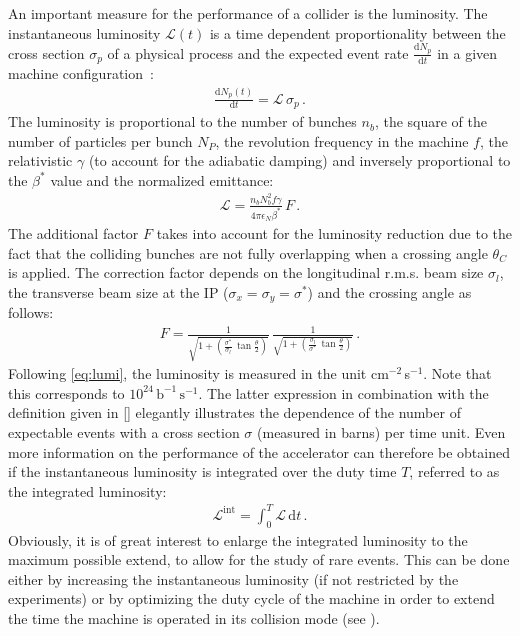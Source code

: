 An important measure for the performance of a collider is the luminosity. The instantaneous luminosity $\mathcal{L}(t)$ is a time dependent proportionality between the cross section $\sigma_p$ of a physical process and the expected event rate $\frac{\mathrm{d}N_p}{\mathrm{d}t}$ in a given machine configuration~\cite{wiedemann1999particle}:
%
\begin{align}
  \frac{\mathrm{d}N_p (t)}{\mathrm{d}t} = \mathcal{L} \, \sigma_p \, .
\end{align}
%
The luminosity is proportional to the number of bunches $n_b$, the square of the number of particles per bunch $N_P$, the revolution frequency in the machine $f$, the relativistic $\gamma$ (to account for the adiabatic damping) and inversely proportional to the $\beta^*$ value and the normalized emittance:
\begin{align}
  \mathcal{L} = \frac{n_b N_b^2 f \gamma}{4 \pi \epsilon_N \beta^*} \, F \, . \label{eq:lumi}
\end{align}
%
The additional factor $F$ takes into account for the luminosity reduction due to the fact that the colliding bunches are not fully overlapping when a crossing angle $\theta_C$ is applied. The correction factor depends on the longitudinal r.m.s. beam size $\sigma_l$, the transverse beam size at the IP ($\sigma_x=\sigma_y=\sigma^*$) and the crossing angle as follows:
%
\begin{align}
  F = \frac{1}{\sqrt{1+\left(\frac{\sigma^*}{\sigma_l} \, \tan \frac{\theta}{2} \right)}} \, \frac{1}{\sqrt{1+\left(\frac{\sigma_l}{\sigma^*} \, \tan \frac{\theta}{2} \right)}} \,.
\end{align}
%
Following \eqref{eq:lumi}, the luminosity is measured in the unit cm$^{-2}\,$s$^{-1}$. Note that this corresponds to $10^{24}\,\text{b}^{-1} \, \text{s}^{-1}$. The latter expression in combination with the definition given in \eqref{} elegantly illustrates the dependence of the number of expectable events with a cross section $\sigma$ (measured in barns) per time unit. Even more information on the performance of the accelerator can therefore be obtained if the instantaneous luminosity is integrated over the duty time $T$, referred to as the integrated luminosity:
%
\begin{align}
  \mathcal{L}^\text{int} = \int_{0}^T \mathcal{L} \, \mathrm{d} t \, .
\end{align} 
%
Obviously, it is of great interest to enlarge the integrated luminosity to the maximum possible extend, to allow for the study of rare events. This can be done either by increasing the instantaneous luminosity (if not restricted by the experiments) or by optimizing the duty cycle of the machine in order to extend the time the machine is operated in its collision mode (see ).

